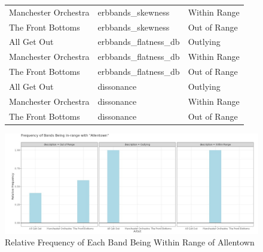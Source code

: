 \documentclass{article}\usepackage[]{graphicx}\usepackage[]{xcolor}
\begin{document}
\begin{figure}
\begin{table}[H]
\begin{tabular}{lll}
  Manchester Orchestra & erbbands\_skewness & Within Range \\ 
  The Front Bottoms & erbbands\_skewness & Out of Range \\ 
  All Get Out & erbbands\_flatness\_db & Outlying \\ 
  Manchester Orchestra & erbbands\_flatness\_db & Within Range \\ 
  The Front Bottoms & erbbands\_flatness\_db & Out of Range \\ 
  All Get Out & dissonance & Outlying \\ 
  Manchester Orchestra & dissonance & Within Range \\ 
  The Front Bottoms & dissonance & Out of Range \\ 
   \hline
\end{tabular}
\endgroup
\label{song.tab}
\end{table}

\end{figure}
\begin{figure}[H]
\begin{center}
\includegraphics[scale=0.4]{datfigure.jpg}
\caption{Relative Frequency of Each Band Being Within Range of Allentown}
\label{plot1}
\end{center}
\end{figure}
\end{document}
